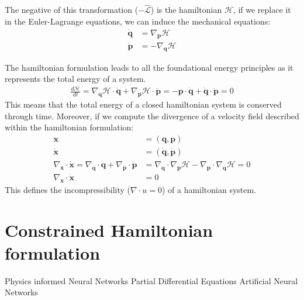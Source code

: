 \documentclass[draft]{agujournal2019}
\begin{document}
The negative of this transformation ($-\hat{\mathcal{L}}$) is the hamiltonian $\mathcal{H}$, if we replace it in the Euler-Lagrange equations, we can induce the mechanical equations:
\begin{align}
    \dot{\mathbf{q}} &= \nabla_\mathbf{p} \mathcal{H} \\
    \dot{\mathbf{p}} &= - \nabla_\mathbf{q} \mathcal{H}
\end{align}
\begin{definition}
    The hamiltonian formulation leads to all the foundational energy principles as it represents the total energy of a system.
    \begin{align}
        \frac{d\mathcal{H}}{dt} = \nabla_\mathbf{q} \mathcal{H} \cdot \dot{\mathbf{q}} + \nabla_\mathbf{p} \mathcal{H} \cdot \dot{\mathbf{p}} = - \mathbf{p} \cdot \dot{\mathbf{q}} + \dot{\mathbf{q}} \cdot \dot{\mathbf{p}} = 0
    \end{align}
    This means that the total energy of a closed hamiltonian system is conserved through time.
    Moreover, if we compute the divergence of a velocity field described within the hamiltonian formulation:
\begin{align}
    \mathbf{x} &= (\mathbf{q}, \mathbf{p}) \\
    \dot{\mathbf{x}} &= (\dot{\mathbf{q}}, \dot{\mathbf{p}}) \\
    \nabla_\mathbf{x} \cdot \dot{\mathbf{x}} = \nabla_\mathbf{q} \cdot \dot{\mathbf{q}} + \nabla_\mathbf{p} \cdot \dot{\mathbf{p}} &= \nabla_\mathbf{q} \cdot \nabla_\mathbf{p} \mathcal{H} - \nabla_\mathbf{p} \cdot \nabla_\mathbf{q} \mathcal{H} = 0 \\
    \nabla_\mathbf{x} \cdot \dot{\mathbf{x}} &= 0
\end{align}
This defines the incompressibility ($\nabla \cdot u = 0$) of a hamiltonian system.


\section{Constrained Hamiltonian formulation}


\end{definition}

\begin{acronyms}
    Physics informed Neural Networks
    Partial Differential Equations
    Artificial Neural Networks
\end{acronyms}
\end{document}

